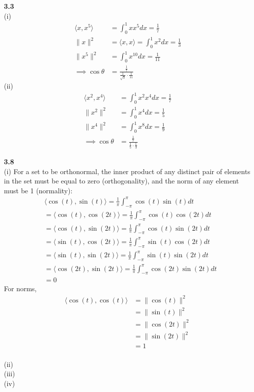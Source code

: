 \documentclass[letterpaper,12pt]{article}
\theoremstyle{definition}
\begin{document}
\noindent\textbf{3.3}\\
(i) \begin{align*}
\langle x,x^5 \rangle &= \int_0^1 x x^5 dx = \frac{1}{7}\\
\|x\|^2 &= \langle x,x \rangle = \int_0^1 x^2 dx = \frac{1}{3}\\
\|x^5\|^2 &= \int_0^1 x^{10} dx = \frac{1}{11}\\
\implies \cos \theta &= \frac{\frac{1}{7}}{\frac{1}{\sqrt{3}} \cdot \frac{1}{11}}
\end{align*}
(ii) \begin{align*}
\langle x^2, x^4 \rangle &= \int_0^1 x^2x^4dx = \frac{1}{7}\\
\|x^2\|^2 &= \int_0^1x^4dx = \frac{1}{5}\\
\|x^4\|^2 &= \int_0^1x^8dx = \frac{1}{9}\\
\implies \cos \theta &= \frac{\frac{1}{7}}{\frac{1}{5} \cdot \frac{1}{3}}
\end{align*}

\noindent\textbf{3.8}\\
(i) For a set to be orthonormal, the inner product of any distinct pair of elements in the set must be equal to zero (orthogonality), and the norm of any element must be 1 (normality):
\begin{align*}
&\langle \cos(t), \sin(t) \rangle = \frac{1}{\pi}\int_{-\pi}^{\pi}\cos(t)\sin(t)dt\\
&= \langle \cos(t), \cos(2t) \rangle = \frac{1}{\pi}\int_{-\pi}^{\pi}\cos(t)\cos(2t)dt\\
&= \langle \cos(t), \sin(2t) \rangle = \frac{1}{\pi}\int_{-\pi}^{\pi}\cos(t)\sin(2t)dt\\
&= \langle \sin(t), \cos(2t) \rangle = \frac{1}{\pi}\int_{-\pi}^{\pi}\sin(t)\cos(2t)dt\\
&= \langle \sin(t), \sin(2t) \rangle = \frac{1}{\pi}\int_{-\pi}^{\pi}\sin(t)\sin(2t)dt\\
&= \langle \cos(2t), \sin(2t) \rangle = \frac{1}{\pi}\int_{-\pi}^{\pi}\cos(2t)\sin(2t)dt\\
&= 0
\end{align*}
For norms,
\begin{align*}
\langle \cos(t),\cos(t) \rangle &= \|\cos(t)\|^2\\
&=\|\sin(t)\|^2\\
&=\|\cos(2t)\|^2\\
&=\|\sin(2t)\|^2\\
&=1
\end{align*}\\
(ii)\\
(iii)\\
(iv)\\
\end{document}
